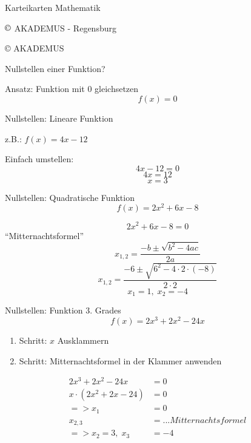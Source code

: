 \documentclass[paper=a6,landscape,ngerman,twoside=true,fontsize=12pt]{scrartcl}
\begin{document}
\begin{frage}
	Karteikarten
\bigskip
	Mathematik
	\large
	
	\bigskip
	
	$\copyright$ AKADEMUS - Regensburg
\end{frage}
\begin{antwort}
	\copyright{} AKADEMUS
\end{antwort}
\begin{frage}
	Nullstellen einer Funktion?
	
\end{frage}
\begin{antwort}
	Ansatz: Funktion mit 0 gleichsetzen
	\[
	f(x)=0
	\]
\end{antwort}
\begin{frage}
	Nullstellen: Lineare Funktion
		
	z.B.: $f(x)=4x-12$
		
\end{frage}
\begin{antwort}
	Einfach umstellen:
	\[
	4x-12=0
	\]
	\[
	4x=12
	\]
	\[
	x=3
	\]
\end{antwort}
\begin{frage}
	Nullstellen: Quadratische Funktion
	\[
		f(x)=2x^2+6x-8
	\]
\end{frage}
\begin{antwort}
		\[
		2x^2+6x-8=0
		\]
	"`Mitternachtsformel"'
	\[
		x_{1,2}=\frac{-b\pm\sqrt{b^2-4ac}}{2a}
	\]
	\[
	x_{1,2}=\frac{-6\pm\sqrt{6^2-4\cdot2\cdot(-8)}}{2\cdot2 }
	\]
	\[
	x_{1}=1,\;x_{2}=-4
	\]

\end{antwort}
\begin{frage}
	Nullstellen: Funktion 3. Grades
	\[
	f(x)=2x^3+2x^2-24x
	\]
\end{frage}
\begin{antwort}
	\normalsize\begin{enumerate}
		\item Schritt: $x$ Ausklammern
		\item Schritt: Mitternachtsformel in der Klammer anwenden
	\end{enumerate}
	\normalsize\begin{align*}
		2x^3+2x^2-24x&=0\\
		x\cdot(2x^2+2x-24)&=0\\
		=>	x_{1}&= 0\\
		x_{2,3}&= ...Mitternachtsformel\\
		=>	x_{2}=3,\;x_{3}&=-4\\
	\end{align*}	
\end{antwort}
\end{document}
